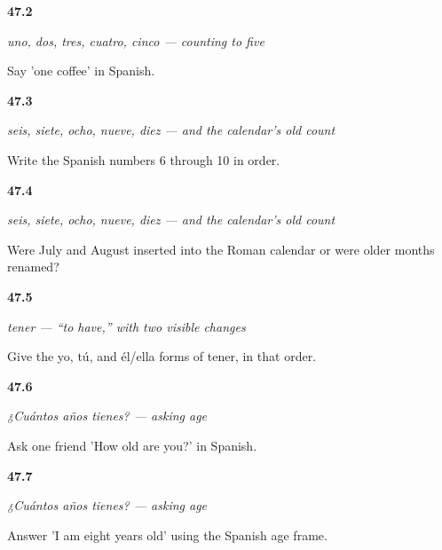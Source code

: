 \noindent\begin{minipage}[t]{\linewidth}
\raggedright
\hypertarget{review-ES-C08-numeros-1-5-coffee}{\textbf{47.2}} \emph{uno, dos, tres, cuatro, cinco — counting to five}\par
\small Say 'one coffee' in Spanish.
\end{minipage}\par\medskip

\noindent\begin{minipage}[t]{\linewidth}
\raggedright
\hypertarget{review-ES-C08-numeros-6-10-count}{\textbf{47.3}} \emph{seis, siete, ocho, nueve, diez — and the calendar's old count}\par
\small Write the Spanish numbers 6 through 10 in order.
\end{minipage}\par\medskip

\noindent\begin{minipage}[t]{\linewidth}
\raggedright
\hypertarget{review-ES-C08-numeros-6-10-month-change}{\textbf{47.4}} \emph{seis, siete, ocho, nueve, diez — and the calendar's old count}\par
\small Were July and August inserted into the Roman calendar or were older months renamed?
\end{minipage}\par\medskip

\noindent\begin{minipage}[t]{\linewidth}
\raggedright
\hypertarget{review-ES-C08-tener-singular-forms}{\textbf{47.5}} \emph{tener — “to have,” with two visible changes}\par
\small Give the yo, tú, and él/ella forms of tener, in that order.
\end{minipage}\par\medskip

\noindent\begin{minipage}[t]{\linewidth}
\raggedright
\hypertarget{review-ES-C08-cuantos-anos-ask}{\textbf{47.6}} \emph{¿Cuántos años tienes? — asking age}\par
\small Ask one friend 'How old are you?' in Spanish.
\end{minipage}\par\medskip

\noindent\begin{minipage}[t]{\linewidth}
\raggedright
\hypertarget{review-ES-C08-cuantos-anos-eight}{\textbf{47.7}} \emph{¿Cuántos años tienes? — asking age}\par
\small Answer 'I am eight years old' using the Spanish age frame.
\end{minipage}\par\medskip

